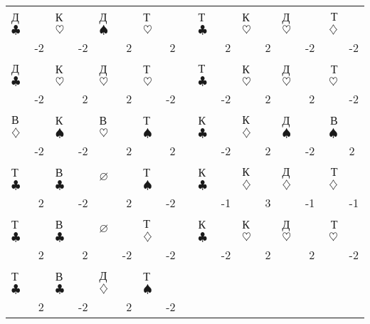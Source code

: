 \begin{table}[htbp]
\begin{SingleSpace}
\begin{tabular}{|LR|LR|LR|LR|c|LR|LR|LR|RL|}
			Д$\clubsuit$ & & К$\heartsuit$ & & Д$\spadesuit$ & & Т$\heartsuit$ & & & Т$\clubsuit$ & & К$\heartsuit$ & & Д$\heartsuit$ & & Т$\diamondsuit$ & \\
			& -2 & & -2 & & 2 & & 2 & & & 2 & & 2 & & -2 & & -2 \\
			 
			Д$\clubsuit$ & & К$\heartsuit$ & & Д$\heartsuit$ & & Т$\heartsuit$ & & & Т$\clubsuit$ & & К$\heartsuit$ & & Д$\heartsuit$ & & Т$\heartsuit$ & \\
			& -2 & & 2 & & 2 & & -2 & & & -2 & & 2 & & 2 & & -2 \\
			 
			В$\diamondsuit$ & & К$\spadesuit$ & & В$\heartsuit$ & & Т$\spadesuit$ & & & К$\clubsuit$ & & К$\diamondsuit$ & & Д$\spadesuit$ & & В$\spadesuit$ & \\
			& -2 & & -2 & & 2 & & 2 & & & -2 & & 2 & & -2 & & 2 \\
			 
			Т$\clubsuit$ & & В$\clubsuit$ & & $\varnothing$ & & Т$\spadesuit$ & & & К$\clubsuit$ & & К$\diamondsuit$ & & Д$\diamondsuit$ & & Т$\diamondsuit$ & \\
			& 2 & & -2 & & 2 & & -2 & & & -1 & & 3 & & -1 & & -1 \\
			 
			Т$\clubsuit$ & & В$\clubsuit$ & & $\varnothing$ & & Т$\diamondsuit$ & & & К$\clubsuit$ & & К$\heartsuit$ & & Д$\heartsuit$ & & Т$\heartsuit$ & \\
			& 2 & & 2 & & -2 & & -2 & & & -2 & & 2 & & 2 & & -2 \\
			 
			Т$\clubsuit$ & & В$\clubsuit$ & & Д$\diamondsuit$ & & Т$\spadesuit$ & \\
			& 2 & & -2 & & 2 & & -2 \\
		\end{tabular}
	\end{SingleSpace}
\end{table}

